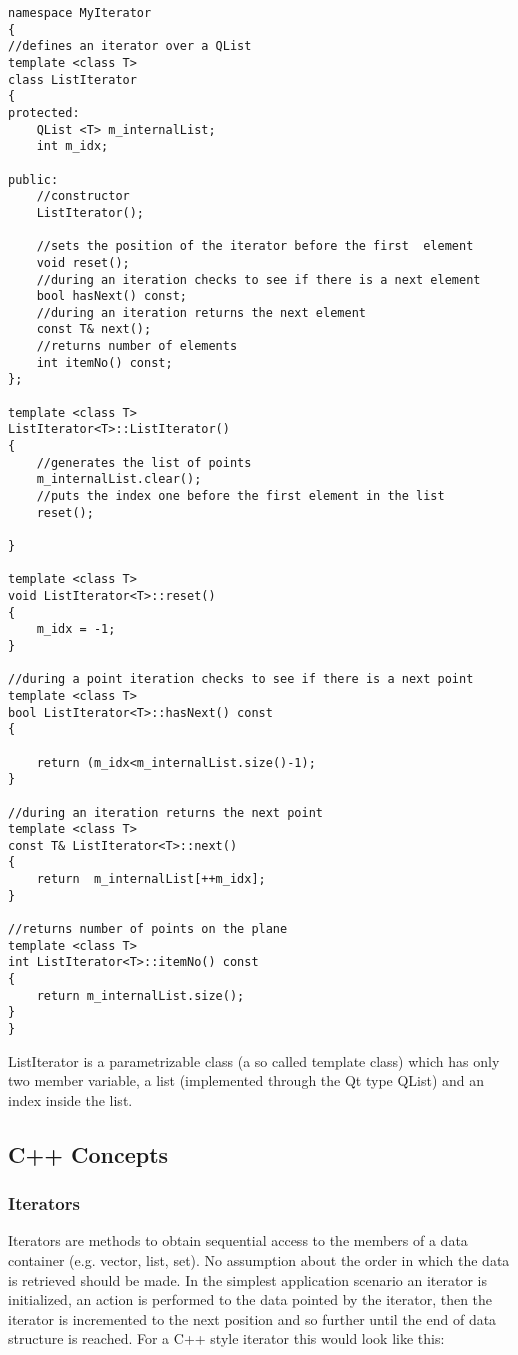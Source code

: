 \begin{lstlisting}
namespace MyIterator
{
//defines an iterator over a QList
template <class T>
class ListIterator
{
protected:
    QList <T> m_internalList;
    int m_idx;

public:
    //constructor
    ListIterator();

    //sets the position of the iterator before the first  element
    void reset();
    //during an iteration checks to see if there is a next element
    bool hasNext() const;
    //during an iteration returns the next element
    const T& next();
    //returns number of elements
    int itemNo() const;
};

template <class T>
ListIterator<T>::ListIterator()
{
    //generates the list of points
    m_internalList.clear();
    //puts the index one before the first element in the list
    reset();

}

template <class T>
void ListIterator<T>::reset()
{
    m_idx = -1;
}

//during a point iteration checks to see if there is a next point
template <class T>
bool ListIterator<T>::hasNext() const
{

    return (m_idx<m_internalList.size()-1);
}

//during an iteration returns the next point
template <class T>
const T& ListIterator<T>::next()
{
    return  m_internalList[++m_idx];
}

//returns number of points on the plane
template <class T>
int ListIterator<T>::itemNo() const
{
    return m_internalList.size();
}
}
\end{lstlisting}

ListIterator is a parametrizable class (a so called template class) which has only two member variable, a list (implemented through the Qt type QList) and an index inside the list. 

\subsection {C++ Concepts}
\subsubsection {Iterators}

Iterators are methods to obtain sequential access to the members of a data container (e.g. vector, list, set). No assumption about the order in which the data is retrieved should be made. In the simplest application scenario an iterator is initialized, an action is performed to the data pointed by the iterator, then the iterator is incremented to the next position and so further until the end of data structure is reached. For a C++ style iterator this would look like this:

